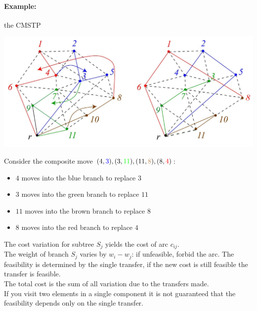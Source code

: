 \documentclass[11pt]{article}
\begin{document}
	\newpage
	
	\paragraph{Example:} the CMSTP
	\begin{center}
		\includegraphics[width=0.9\columnwidth]{img/CMSTP1}
	\end{center}
	Consider the composite move $(4, {\color{blue} 3}), (3, {\color{green} 11}), (11, {\color{brown} 8}), (8, {\color{red} 4})$:
	\begin{itemize}
		\item $4$ moves into the blue branch to replace $3$
		\item $3$ moves into the green branch to replace $11$
		\item $11$ moves into the brown branch to replace $8$
		\item $8$ moves into the red branch to replace $4$
	\end{itemize}
	
	The cost variation for subtree $S_j$ yields the cost of arc $c_{ij}$.\\
	
	The weight of branch $S_j$ varies by $w_i - w_j$: if unfeasible, forbid the arc. The feasibility is determined by the single transfer, if the new cost is still feasible the transfer is feasible.\\
	
	The total cost is the sum of all variation due to the transfers made.\\
	
	If you visit two elements in a single component it is not guaranteed that the feasibility depends only on the single transfer.\\
	
	\newpage
	
\end{document}
